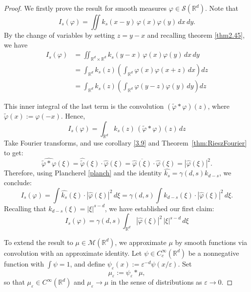 \documentclass[12pt,a4paper]{report}
\theoremstyle{definition}
\begin{document}
\begin{proof}
We firstly prove the result for smooth measures $\varphi \in \mathcal{S}(\mathbb{R}^d)$. Note that
\[
I_s(\varphi) = \iint k_s(x - y) \, \varphi(x) \varphi(y) \, dx \, dy.
\]
By the change of variables by setting \( z = y - x \) and recalling theorem \ref{thm2.45}, we have
\begin{align*}
I_s(\varphi)
&= \iint_{\mathbb{R}^d \times \mathbb{R}^d} k_s(y - x) \, \varphi(x) \varphi(y) \, dx \, dy \\
&= \int_{\mathbb{R}^d} k_s(z) \left( \int_{\mathbb{R}^d} \varphi(x) \varphi(x + z) \, dx \right) dz \\
&= \int_{\mathbb{R}^d} k_s(z) \left( \int_{\mathbb{R}^d} \varphi(y - z) \varphi(y) \, dy \right) dz
\end{align*}

\noindent
This inner integral of the last term is the convolution \( (\widetilde{\varphi} * \varphi)(z) \), where \\ \( \widetilde{\varphi}(x) := \varphi(-x) \). Hence,
\[
I_s(\varphi) = \int_{\mathbb{R}^d} k_s(z) \, (\widetilde{\varphi} * \varphi)(z) \, dz
\]
Take Fourier transforms, and use corollary \ref{3.9} and Theorem~\ref{thm:RieszFourier} to get:
\[
\widehat{\widetilde{\varphi} * \varphi}(\xi) = \widehat{\widetilde{\varphi}}(\xi) \cdot \widehat{\varphi}(\xi) = \overline{\widehat{\varphi}(\xi)} \cdot \widehat{\varphi}(\xi) = |\widehat{\varphi}(\xi)|^2.
\]
Therefore, using Plancherel \ref{planch} and the identity \( \widehat{k_s} = \gamma(d,s) k_{d-s} \), we conclude:
\[
I_s(\varphi) = \int \widehat{k_s}(\xi) \cdot |\widehat{\varphi}(\xi)|^2 \, d\xi
= \gamma(d,s) \int k_{d-s}(\xi) \cdot |\widehat{\varphi}(\xi)|^2 \, d\xi.
\]
Recalling that \( k_{d-s}(\xi) = |\xi|^{s - d} \), we have established our first claim:
\begin{equation}
\label{smoothmeasures}
 I_s(\varphi) = \gamma(d,s) \int_{\mathbb{R}^d} |\widehat{\varphi}(\xi)|^2 \, |\xi|^{s-d} \, d\xi
\end{equation}

To extend the result to \( \mu \in \mathcal{M}(\mathbb{R}^d) \), we approximate \( \mu \) by smooth functions via convolution with an approximate identity. Let \( \psi \in C_c^\infty(\mathbb{R}^d) \) be a nonnegative function with \( \int \psi = 1 \), and define \( \psi_\varepsilon(x) := \varepsilon^{-d} \psi(x/\varepsilon) \). Set
\[
\mu_\varepsilon := \psi_\varepsilon * \mu,
\]
so that \( \mu_\varepsilon \in C^\infty(\mathbb{R}^d) \) and \( \mu_\varepsilon \to \mu \) in the sense of distributions as \( \varepsilon \to 0 \).


\end{proof}
\end{document}
